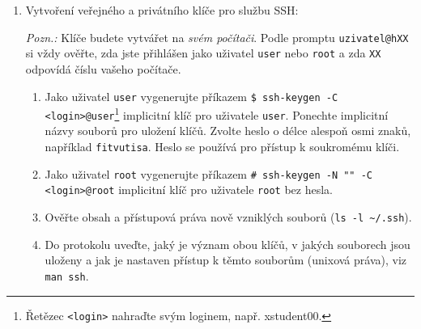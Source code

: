 \documentclass[a4paper,11pt]{article}
\begin{document}
\begin{enumerate}
  \item Vytvoření veřejného a privátního klíče pro službu SSH:

  {\em Pozn.:} Klíče budete vytvářet na {\em svém počítači}. Podle promptu \verb|uzivatel@hXX| si vždy ověřte, zda jste přihlášen jako uživatel {\tt user} nebo {\tt root} a zda \verb|XX| odpovídá číslu vašeho počítače.
    \begin{enumerate}
      \item Jako uživatel {\tt user} vygenerujte příkazem \verb|$ ssh-keygen -C <login>@user|\footnote{Řetězec {\tt <login>} nahraďte svým loginem, např. xstudent00.} implicitní klíč pro uživatele {\tt user}. Ponechte implicitní názvy souborů pro uložení klíčů. Zvolte heslo o délce alespoň osmi znaků, například \texttt{fitvutisa}. Heslo se používá pro přístup k soukromému klíči.
      \item Jako uživatel {\tt root} vygenerujte příkazem \verb|# ssh-keygen -N "" -C <login>@root|
        implicitní klíč pro uživatele {\tt root} bez hesla.
      \item Ověřte obsah a přístupová práva nově vzniklých souborů (\verb|ls -l ~/.ssh|).
      \item Do protokolu uveďte, jaký je význam obou klíčů, v jakých souborech jsou uloženy a jak je nastaven přístup k těmto souborům (unixová práva), viz {\tt man ssh}.
    \end{enumerate}


\end{enumerate}
\end{document}
